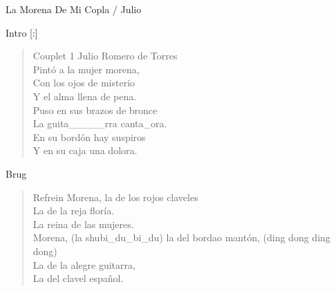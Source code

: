\begin{song}{La Morena De Mi Copla / Julio}

\begin{instrumental}{Intro}
\measure*{}[:]
\measure{}
\end{instrumental}

\begin{verse}{Couplet 1}
Julio Romero de Torres\\
Pintó a la mujer morena,\\
Con los ojos de misterio\chord{}\\
Y el alma llena de pena.\\
Puso en sus brazos\phantom{x}\phantom{xxx} de bronce\\
La guita\_\_\_\_\_rra canta\_ora.\\
En su bordón hay suspiros\hspace{4em}\\
Y en su caja una dolora.\\
\end{verse}

\begin{instrumental}{Brug}
\measure{}\measure{}\measure{}
\end{instrumental}

\begin{verse}{Refrein}
\hspace{6ex}Morena, la de los rojos claveles\\
La de la reja floría.\\
La reina de las\hspace{\wlskip} mujeres.\\
Morena, \small{(la shubi\_du\_bi\_du)} la del bordao mantón, \small{(ding dong ding dong)}\\
La de la alegre guitarra, \\
La del clavel español.
\end{verse}


\end{song}
